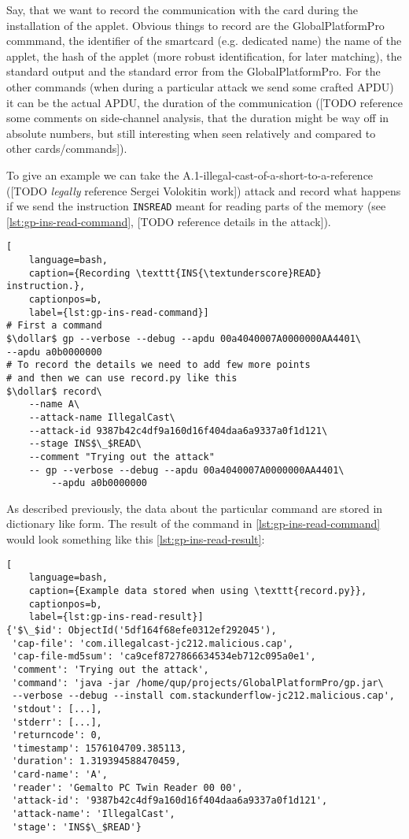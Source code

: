 \documentclass[a4paper]{scrartcl}
\newcommand{\dollar}{\mbox{\textdollar}}
\begin{document}
Say, that we want to record the communication with the card during the installation of the applet. Obvious things to record are the GlobalPlatformPro commmand, the identifier of the smartcard (e.g. dedicated name) the name of the applet, the hash of the applet (more robust identification, for later matching), the standard output and the standard error from the GlobalPlatformPro. For the other commands (when during a particular attack we send some crafted APDU) it can be the actual APDU, the duration of the communication ([TODO reference some comments on side-channel analysis, that the duration might be way off in absolute numbers, but still interesting when seen relatively and compared to other cards/commands]).

To give an example we can take the A.1-illegal-cast-of-a-short-to-a-reference ([TODO \textit{legally} reference Sergei Volokitin work]) attack and record what happens if we send the instruction \texttt{INS{\textunderscore}READ} meant for reading parts of the memory (see \ref{lst:gp-ins-read-command}, [TODO reference details in the attack]).

\begin{lstlisting}[
    language=bash,
    caption={Recording \texttt{INS{\textunderscore}READ} instruction.},
    captionpos=b,
    label={lst:gp-ins-read-command}]
# First a command
$\dollar$ gp --verbose --debug --apdu 00a4040007A0000000AA4401\
--apdu a0b0000000
# To record the details we need to add few more points
# and then we can use record.py like this
$\dollar$ record\
    --name A\
    --attack-name IllegalCast\
    --attack-id 9387b42c4df9a160d16f404daa6a9337a0f1d121\
    --stage INS$\_$READ\
    --comment "Trying out the attack"
    -- gp --verbose --debug --apdu 00a4040007A0000000AA4401\
        --apdu a0b0000000
\end{lstlisting}

As described previously, the data about the particular command are stored in dictionary like form. The result of the command in \ref{lst:gp-ins-read-command} would look something like this \ref{lst:gp-ins-read-result}:
\begin{lstlisting}[
    language=bash,
    caption={Example data stored when using \texttt{record.py}},
    captionpos=b,
    label={lst:gp-ins-read-result}]
{'$\_$id': ObjectId('5df164f68efe0312ef292045'),
 'cap-file': 'com.illegalcast-jc212.malicious.cap',
 'cap-file-md5sum': 'ca9cef8727866634534eb712c095a0e1',
 'comment': 'Trying out the attack',
 'command': 'java -jar /home/qup/projects/GlobalPlatformPro/gp.jar\
 --verbose --debug --install com.stackunderflow-jc212.malicious.cap',
 'stdout': [...],
 'stderr': [...],
 'returncode': 0,
 'timestamp': 1576104709.385113,
 'duration': 1.319394588470459,
 'card-name': 'A',
 'reader': 'Gemalto PC Twin Reader 00 00',
 'attack-id': '9387b42c4df9a160d16f404daa6a9337a0f1d121',
 'attack-name': 'IllegalCast',
 'stage': 'INS$\_$READ'}

\end{lstlisting}
\end{document}

